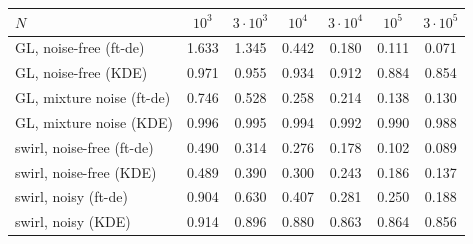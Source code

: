 \begin{tabular}{lcccccc}
\toprule
$N$ & $10^{3}$ & $3\cdot10^{3}$ & $10^{4}$ & $3\cdot10^{4}$ & $10^{5}$ & $3\cdot10^{5}$ \\
\midrule
GL, noise-free (ft-de) & 1.633 & 1.345 & 0.442 & 0.180 & 0.111 & 0.071 \\
GL, noise-free (KDE) & 0.971 & 0.955 & 0.934 & 0.912 & 0.884 & 0.854 \\
\addlinespace
GL, mixture noise (ft-de) & 0.746 & 0.528 & 0.258 & 0.214 & 0.138 & 0.130 \\
GL, mixture noise (KDE) & 0.996 & 0.995 & 0.994 & 0.992 & 0.990 & 0.988 \\
\addlinespace
swirl, noise-free (ft-de) & 0.490 & 0.314 & 0.276 & 0.178 & 0.102 & 0.089 \\
swirl, noise-free (KDE) & 0.489 & 0.390 & 0.300 & 0.243 & 0.186 & 0.137 \\
\addlinespace
swirl, noisy (ft-de) & 0.904 & 0.630 & 0.407 & 0.281 & 0.250 & 0.188 \\
swirl, noisy (KDE) & 0.914 & 0.896 & 0.880 & 0.863 & 0.864 & 0.856 \\
\bottomrule
\end{tabular}
